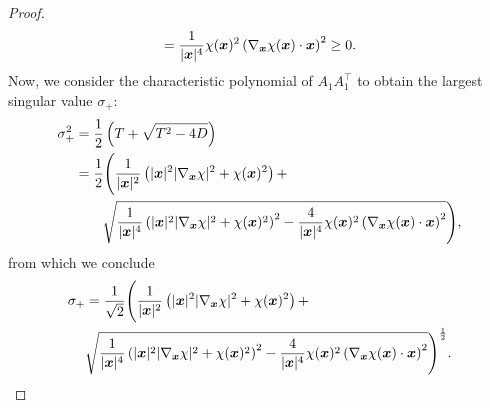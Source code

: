 \begin{proof}
\begin{align*}
        =\frac{1}{|{{\bm{x}}}|^4} \chi({{\bm{x}}})^2 \left( \nabla_{{{\bm{x}}}}\chi({{\bm{x}}})\cdot {{\bm{x}}} \right) ^2
        \geq 0.
    \end{align*}
    Now, we consider the characteristic polynomial of $A_1 A_1^\top$ to obtain the largest singular value $\sigma_+$:
    \begin{align*}
        \sigma_+^2 &= \frac{1}{2}\left(  T + \sqrt{T^2-4D} \right)\\
        &=\frac{1}{2} \Bigg(  \frac{1}{|{{\bm{x}}}|^2}\left( |{{\bm{x}}}|^2  |\nabla_{{{\bm{x}}}} \chi|^2  +\chi({{\bm{x}}})^2   \right) + \nonumber\\
        &\qquad \sqrt{\frac{1}{|{{\bm{x}}}|^4}\left( |{{\bm{x}}}|^2  |\nabla_{{{\bm{x}}}} \chi|^2  +\chi({{\bm{x}}})^2   \right)^2-\frac{4}{|{{\bm{x}}}|^4} \chi({{\bm{x}}})^2 \left( \nabla_{{{\bm{x}}}}\chi({{\bm{x}}})\cdot {{\bm{x}}} \right) ^2} \Bigg),
    \end{align*}
    from which we conclude
    \begin{align}
        \sigma_+ &= \frac{1}{\sqrt{2}} \Bigg(  \frac{1}{|{{\bm{x}}}|^2}\left( |{{\bm{x}}}|^2  |\nabla_{{{\bm{x}}}} \chi|^2  +\chi({{\bm{x}}})^2   \right) + \\
        &\sqrt{\frac{1}{|{{\bm{x}}}|^4}\left( |{{\bm{x}}}|^2  |\nabla_{{{\bm{x}}}} \chi|^2  +\chi({{\bm{x}}})^2   \right)^2-\frac{4}{|{{\bm{x}}}|^4} \chi({{\bm{x}}})^2 \left( \nabla_{{{\bm{x}}}}\chi({{\bm{x}}})\cdot {{\bm{x}}} \right) ^2} \Bigg)^\frac{1}{2}.\label{eq:derbound1}
    \end{align}


\end{proof}
